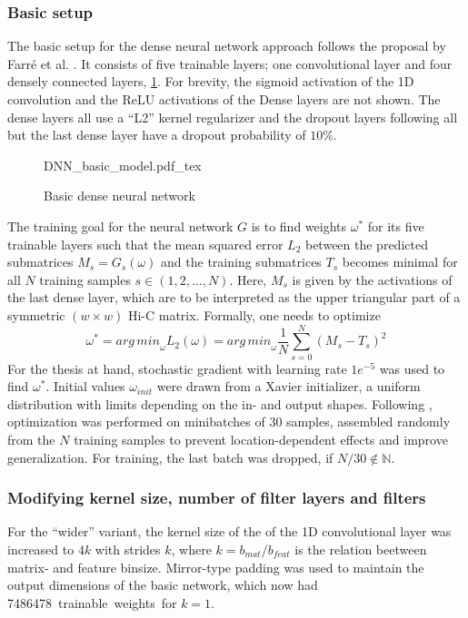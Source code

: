 \subsubsection{Basic setup} \label{sec:methods:basicSetup}
The basic setup for the dense neural network approach follows the proposal by Farr\'e et al. \cite{Farre2018a}.
It consists of five trainable layers; one convolutional layer and four densely connected layers, \cref{fig:methods:basic_dnn}.
For brevity, the sigmoid activation of the 1D convolution and the ReLU activations of the Dense layers are not shown.
The dense layers all use a ``L2'' kernel regularizer and the dropout layers following all but the last dense layer have a dropout probability of $10\%$.
\begin{figure}[htb]
    \small
    \centering
    {DNN_basic_model.pdf_tex}
    \caption{Basic dense neural network}
    \label{fig:methods:basic_dnn}
\end{figure}

The training goal for the neural network $G$ is to find weights $\omega^*$ for its five trainable layers 
such that the mean squared error $L_2$ between the predicted submatrices $M_s = G_s(\omega)$ 
and the training submatrices $T_s$ becomes minimal for all $N$ training samples $s \in (1,2,\dots, N)$. 
Here, $M_s$ is given by the activations of the last dense layer, which are to be interpreted as the upper triangular 
part of a symmetric $(w\times w)$ Hi-C matrix.
Formally, one needs to optimize
\begin{equation}
 \omega^* = {arg\,min}_\omega L_2(\omega) = {arg\,min}_\omega \frac{1}{N} \sum_{s=0}^N (M_s - T_s)^2 \label{eq:methods:nn-mse}
\end{equation} 
For the thesis at hand, stochastic gradient with learning rate $1e^{-5}$  was used to find $\omega^*$.
Initial values $\omega_{init}$ were drawn from a Xavier initializer, a uniform distribution with limits depending on the in- and output shapes.
Following \cite{Farre2018a}, optimization was performed on minibatches of 30 samples, assembled randomly from the $N$ training samples
to prevent location-dependent effects and improve generalization.
For training, the last batch was dropped, if $N/30 \not \in \mathbb{N}$. 


\subsubsection{Modifying kernel size, number of filter layers and filters}
For the ``wider'' variant, the kernel size of the of the 1D convolutional layer was increased to $4k$ with strides $k$,
where $k=b_{mat}/b_{feat}$ is the relation beetween matrix- and feature binsize.
Mirror-type padding was used to maintain the output dimensions of the basic network, which now had \SI{7486478} trainable weights
for $k=1$.

